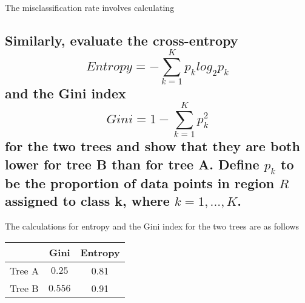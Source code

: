 \documentclass{article}
\begin{document}
		The misclassification rate involves calculating 
	\subsection{Similarly, evaluate the cross-entropy 
		\[ Entropy = - \sum_{k = 1}^{K}p_{k}log_{2}p_{k}\]
		and the Gini index
		\[ Gini = 1 - \sum_{k = 1}^{K}p^{2}_{k}\]
		for the two trees and show that they are both lower for tree B than for tree A. Define $p_{k}$
		to be the proportion of data points in region $R$ assigned to class k, where $k = 1,...,K$.
		}
		The calculations for entropy and the Gini index for the two trees are as follows

		\begin{centering}
		\begin{tabular}{|c | c | c |}
			\hline
			 & Gini & Entropy\\\hline
			Tree A & $0.25$ & 0.81\\\hline
			Tree B & $0.556$ & 0.91 \\
			\hline
		\end{tabular}
		\end{centering}
\end{document}
